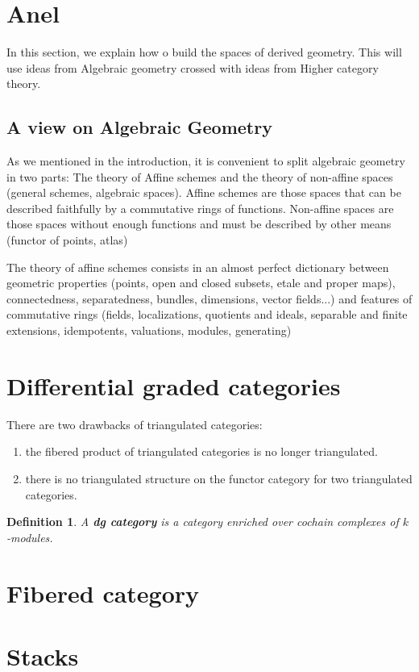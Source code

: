 \documentclass[11pt]{article}
\newtheorem{dfn}[thm]{Definition}
\begin{document}
\section{Anel}
In this section, we explain how o build the spaces of derived geometry. This will use ideas from Algebraic geometry crossed with ideas from Higher category theory.
\subsection{A view on Algebraic Geometry}
As we mentioned in the introduction, it is convenient to split algebraic geometry in two parts: The theory of Affine schemes and the theory of non-affine spaces (general schemes, algebraic spaces). Affine schemes are those spaces that can be described faithfully by a commutative rings of functions. Non-affine spaces are those spaces without enough functions and must be described by other means (functor of points, atlas)

The theory of affine schemes consists in an almost perfect dictionary between geometric properties (points, open and closed subsets, etale and proper maps), connectedness, separatedness, bundles, dimensions, vector fields...) and features of commutative rings (fields, localizations, quotients and ideals, separable and finite extensions, idempotents, valuations, modules, generating)

\section{Differential graded categories}
There are two drawbacks of triangulated categories:
\begin{enumerate}
\item the fibered product of triangulated categories is no longer triangulated.
\item there is no triangulated structure on the functor category for two triangulated categories.
\end{enumerate}

\begin{dfn}
A \textbf{dg category} is a category enriched over cochain complexes of $k$-modules.
\end{dfn}
\section{Fibered category}
\section{Stacks}
\end{document}
